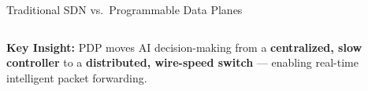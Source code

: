{\begin{frame}{Traditional SDN vs.\ Programmable Data Planes}
\begin{table}
\begin{tabular}{p{3.2cm} p{4.2cm} p{4.2cm}}
    \end{tabular}
  \end{table}

  \vspace{0.20cm}

  \begin{tcolorbox}[
    enhanced,
    boxrule  = 0pt,
    colback  = HUApale,
    colframe = HUApale,
    arc      = 4pt,
    left=8pt, right=8pt, top=4pt, bottom=4pt,
    borderline west={4pt}{0pt}{HUAblue},
  ]
    \footnotesize
    \textcolor{HUAblue}{\bfseries Key Insight:}
    PDP moves AI decision-making from a
    \textcolor{problemorange}{\bfseries centralized, slow controller}
    to a
    \textcolor{solutiongreen}{\bfseries distributed, wire-speed switch} ---
    enabling real-time intelligent packet forwarding.
  \end{tcolorbox}

\end{frame}
}